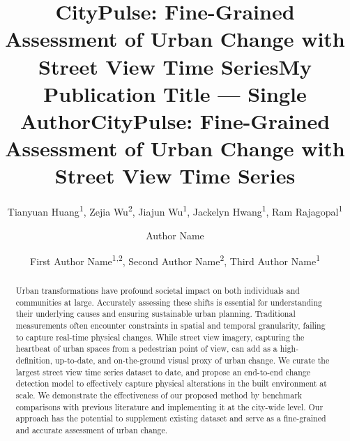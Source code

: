 \documentclass[letterpaper]{article} %
\title{CityPulse: Fine-Grained Assessment of Urban Change with\\ Street View Time Series}
\author{
    Tianyuan Huang\textsuperscript{\rm 1}\equalcontrib,
    Zejia Wu\textsuperscript{\rm 2}\equalcontrib,
    Jiajun Wu\textsuperscript{\rm 1},
    Jackelyn Hwang\textsuperscript{\rm 1},
    Ram Rajagopal\textsuperscript{\rm 1}
}
\title{My Publication Title --- Single Author}
\author {
    Author Name
}
\title{CityPulse: Fine-Grained Assessment of Urban Change with\\ Street View Time Series}
\author {
    First Author Name\textsuperscript{\rm 1,\rm 2},
    Second Author Name\textsuperscript{\rm 2},
    Third Author Name\textsuperscript{\rm 1}
}
\begin{document}
\maketitle

\begin{abstract}
Urban transformations have profound societal impact on both individuals and communities at large. Accurately assessing these shifts is essential for understanding their underlying causes and ensuring sustainable urban planning. Traditional measurements often encounter constraints in spatial and temporal granularity, failing to capture real-time physical changes. While street view imagery, capturing the heartbeat of urban spaces from a pedestrian point of view, can add as a high-definition, up-to-date, and on-the-ground visual proxy of urban change. We curate the largest street view time series dataset to date, and propose an end-to-end change detection model to effectively capture physical alterations in the built environment at scale. We demonstrate the effectiveness of our proposed method by benchmark comparisons with previous literature and implementing it at the city-wide level. Our approach has the potential to supplement existing dataset and serve as a fine-grained and accurate assessment of urban change.

\end{abstract}
\end{document}
